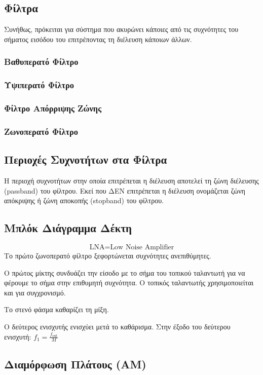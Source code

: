\documentclass[a4paper,12pt]{article}
\begin{document}
\subsection*{Φίλτρα}
Συνήθως, πρόκειται για σύστημα που ακυρώνει κάποιες από τις συχνότητες του σήματος εισόδου του επιτρέποντας τη διέλευση κάποιων άλλων.

\subsubsection*{Βαθυπερατό Φίλτρο}
\subsubsection*{Υψιπερατό Φίλτρο}
\subsubsection*{Φίλτρο Απόρριψης Ζώνης}
\subsubsection*{Ζωνοπερατό Φίλτρο}

\subsection*{Περιοχές Συχνοτήτων στα Φίλτρα}
Η περιοχή συχνοτήτων στην οποία επιτρέπεται η διέλευση αποτελεί τη ζώνη διέλευσης (passband) του φίλτρου. Εκεί που ΔΕΝ επιτρέπεται η διέλευση ονομάζεται ζώνη απόκριψης ή ζώνη αποκοπής (stopband) του φίλτρου.

\subsection*{Μπλόκ Διάγραμμα Δέκτη}
\[
\text{LNA}=\text{Low Noise Amplifier}
\]
Το πρώτο ζωνοπερατό φίλτρο ξεφορτώνεται συχνότητες ανεπιθύμητες.

Ο πρώτος μίκτης συνδυάζει την είσοδο με το σήμα του τοπικού ταλαντωτή για να φέρουμε το σήμα στην επιθυμητή συχνότητα. Ο τοπικός ταλαντωτής χρησιμοποιείται και για συγχρονισμό.

Το στενό φάσμα καθαρίζει τη μίξη.

Ο δεύτερος ενισχυτής ενισχύει μετά το καθάρισμα.
Στην έξοδο του δεύτερου ενισχυτή: \(f_1=\frac{f_{\text{out}}}{M}\)

\subsection*{Διαμόρφωση Πλάτους (AM)}
\end{document}
